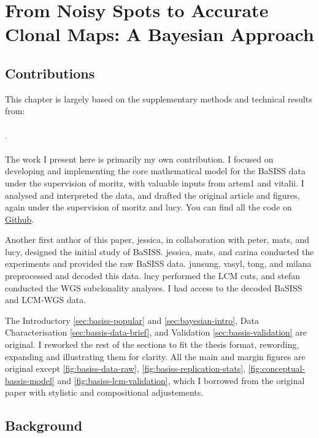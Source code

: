 \chapter{From Noisy Spots to Accurate Clonal Maps: A Bayesian Approach}
\label{sec:chapter-basiss-model}

\section*{Contributions}
This chapter is largely based on the supplementary methods and technical results from:
\\~\\
 . 
\\~\\
The work I present here is primarily my own contribution. I focused on developing and implementing the core mathematical model for the \acs{BaSISS} data under the supervision of \ac{moritz}, with valuable inputs from \ac{artem1} and \ac{vitalii}. I analysed and interpreted the data, and drafted the original article and figures, again under the supervision of \ac{moritz} and \ac{lucy}. You can find all the code on \href{https://github.com/gerstung-lab/BaSISS}{Github}.

Another first author of this paper, \ac{jessica}, in collaboration with \ac{peter}, \ac{mats}, and \ac{lucy}, designed the initial study of \acs{BaSISS}. \ac{jessica}, \ac{mats}, and \ac{carina} conducted the experiments and provided the raw \acs{BaSISS} data. \ac{junsung}, \ac{vasyl}, \ac{tong}, and \ac{milana} preprocessed and decoded this data. \ac{lucy} performed the \acs{LCM} cuts, and \ac{stefan} conducted the \acs{WGS} subclonality analyses. I had access to the decoded \acs{BaSISS} and \acs{LCM}-\acs{WGS} data.

The Introductory \cref{sec:basiss-popular} and \cref{sec:bayesian-intro}, Data Characterisation \cref{sec:bassis-data-brief}, and Validation \cref{sec:bassis-validation} are original. I reworked the rest of the sections to fit the thesis format, rewording, expanding and illustrating them for clarity. All the main and margin figures are original except \cref{fig:basiss-data-raw}, \cref{fig:basiss-replication-stats}, \cref{fig:conceptual-bassis-model} and \cref{fig:basiss-lcm-validation}, which I borrowed from the original paper with stylistic and compositional adjustements. 

\section{Background}
